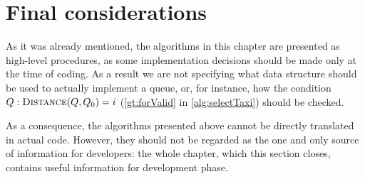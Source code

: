 \section{Final considerations}
As it was already mentioned, the algorithms in this chapter are presented as \mbox{high-level} procedures, as some implementation decisions should be made only at the time of coding. As a result we are not specifying what data structure should be used to actually implement a queue, or, for instance, how the condition $Q : \Call{Distance}{Q,Q_0}=i$ (\cref{gt:forValid} in \cref{alg:selectTaxi}) should be checked.

As a consequence, the algorithms presented above cannot be directly translated in actual code. However, they should not be regarded as the one and only source of information for developers: the whole chapter, which this section closes, contains useful information for development phase.


